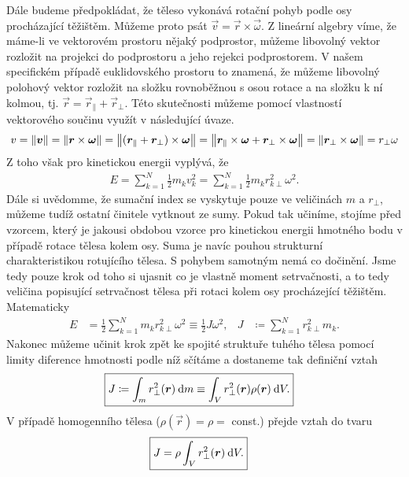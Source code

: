 \documentclass{article}
\begin{document}
			Dále budeme předpokládat, že těleso vykonává rotační pohyb podle osy procházající těžištěm. Můžeme proto psát $\vec v = \vec r \times \vec \omega$. Z lineární algebry víme, že máme-li ve vektorovém prostoru nějaký podprostor, můžeme libovolný vektor rozložit na projekci do podprostoru a jeho rejekci podprostorem. V našem specifickém případě euklidovského prostoru to znamená, že můžeme libovolný polohový vektor rozložit na složku rovnoběžnou s osou rotace a na složku k ní kolmou, tj. $\vec r = \vec r_\parallel + \vec r_\perp$. Této skutečnosti můžeme pomocí vlastností vektorového součinu využít v následující úvaze.
			\begin{align*}
				v = \left\lVert\boldsymbol v\right\rVert = \left\lVert\boldsymbol r \times \boldsymbol \omega\right\rVert = \left\lVert(\boldsymbol r_\parallel + \boldsymbol r_\perp) \times \boldsymbol \omega\right\rVert  = \left\lVert\boldsymbol r_\parallel \times \boldsymbol \omega + \boldsymbol r_\perp \times \boldsymbol \omega\right\rVert = \left\lVert\boldsymbol r_\perp \times \boldsymbol \omega\right\rVert = r_\perp \omega
			\end{align*}
			Z toho však pro kinetickou energii vyplývá, že
			\begin{align*}
				E = \sum_{k=1}^{N} \frac 12 m_k v_k^2 = \sum_{k=1}^{N} \frac 12 m_k r_{k\perp}^2 \omega^2.
			\end{align*}
			Dále si uvědomme, že sumační index se vyskytuje pouze ve veličinách $m$ a $r_\perp$, můžeme tudíž ostatní činitele vytknout ze sumy. Pokud tak učiníme, stojíme před vzorcem, který je jakousi obdobou vzorce pro kinetickou energii hmotného bodu v případě rotace tělesa kolem osy. Suma je navíc pouhou strukturní charakteristikou rotujícího tělesa. S pohybem samotným nemá co dočinění. Jsme tedy pouze krok od toho si ujasnit co je vlastně moment setrvačnosti, a to tedy veličina popisující setrvačnost tělesa při rotaci kolem osy procházející těžištěm. Matematicky
			\begin{align*}
				E &= \frac 12 \sum_{k=1}^{N} m_k r_{k\perp}^2 \omega^2 \equiv \frac 12 J \omega^2,
			&
				J &\coloneqq \sum_{k=1}^{N} r_{k\perp}^2 m_k.
			\end{align*}
			Nakonec můžeme učinit krok zpět ke spojité struktuře tuhého tělesa pomocí limity diference hmotnosti podle níž sčítáme a dostaneme tak definiční vztah
			\begin{align}
				\Aboxed{J \coloneqq \int_m r_\perp^2 (\vec r) \: \d m \equiv \int_V r_\perp^2 (\vec r) \rho (\vec r) \: \d V.}
			\end{align}
			V případě homogenního tělesa ($\rho(\vec r) = \rho =$ const.) přejde vztah do tvaru
			\begin{align}
				\Aboxed{J = \rho \int_V r_\perp^2 (\vec r) \: \d V.}
			\end{align}
		\newpage
		
\end{document}
